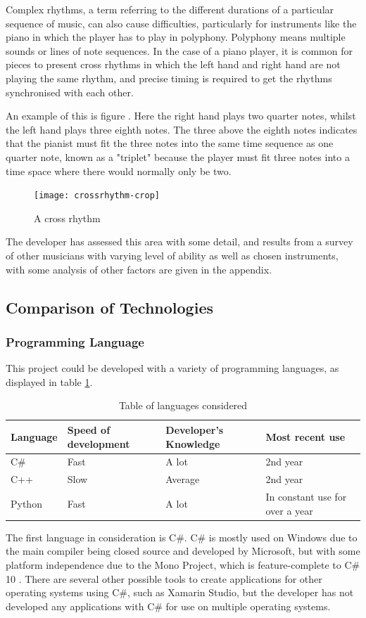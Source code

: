 Complex rhythms, a term referring to the different durations of a particular sequence of music, can also cause difficulties, particularly for instruments like the piano in which the player has to play in polyphony. Polyphony means multiple sounds or lines of note sequences. In the case of a piano player, it is common for pieces to present cross rhythms in which the left hand and right hand are not playing the same rhythm, and precise timing is required to get the rhythms synchronised with each other. 

An example of this is figure \label{fig:crossrhythms}. Here the right hand plays two quarter notes, whilst the left hand plays three eighth notes. The three above the eighth notes indicates that the pianist must fit the three notes into the same time sequence as one quarter note, known as a "triplet" because the player must fit three notes into a time space where there would normally only be two.

\begin{figure}[H]
\centering
\texttt{[image: crossrhythm-crop]}
\caption{A cross rhythm}
\label{fig:crossrhythms}	
\end{figure}

The developer has assessed this area with some detail, and results from a survey of other musicians with varying level of ability as well as chosen instruments, with some analysis of other factors are given in the appendix.

\subsection{Comparison of Technologies}
\subsubsection{Programming Language}
This project could be developed with a variety of programming languages, as displayed in table \ref{table:langs}.

\begin{table}[H]
\centering
\begin{tabular}{| l | l | l | l |} \hline
  {Language} & {Speed of development} & {Developer's Knowledge} & {Most recent use} \\ \hline
  C\# & Fast & A lot & 2nd year \\ \hline
  C++ & Slow & Average & 2nd year \\ \hline
  Python & Fast & A lot & In constant use for over a year \\ \hline
  
\end{tabular}
\caption{Table of languages considered}
\label{table:langs}
\end{table}
The first language in consideration is C\#. C\# is mostly used on Windows due to the main compiler being closed source and developed by Microsoft, but with some platform independence due to the Mono Project, which is feature-complete to C\# 10 \parencite{MonoDev}. There are several other possible tools to create applications for other operating systems using C\#, such as Xamarin Studio, but the developer has not developed any applications with C\# for use on multiple operating systems. 

